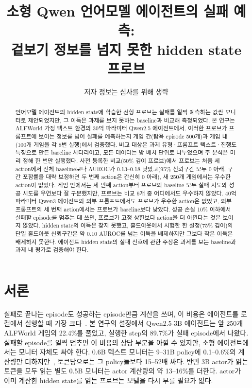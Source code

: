 \documentclass[10pt]{article}
\title{소형 Qwen 언어모델 에이전트의 실패 예측:\\겉보기 정보를 넘지 못한 hidden state 프로브}
\author{저자 정보는 심사를 위해 생략}
\date{}
\begin{document}
\maketitle

\begin{abstract}
언어모델 에이전트의 hidden state에 학습한 선형 프로브는 실패를 일찍 예측하는 값싼 모니터로 제안되었지만, 그 이득은 과제를 보지 못하는 baseline과 비교해 측정되었다.
본 연구는 ALFWorld 가정 텍스트 환경의 30억 파라미터 Qwen2.5 에이전트에서, 이러한 프로브가 프롬프트에 보이는 정보를 넘어 실패를 예측하는지 게임 간(탐욕 episode 500개)과 게임 내(100개 게임을 각 8번 실행)에서 검증했다.
비교 대상은 과제 유형·프롬프트 텍스트·진행도 특징으로 만든 baseline 사다리이고, 모든 데이터는 방 배치 단위로 나누었으며 주 분석은 미리 정해 한 번만 실행했다.
사전 등록한 비교(50\% 깊이 프로브)에서 프로브는 처음 세 action에서 전체 baseline보다 AUROC가 0.13--0.18 낮았고(95\% 신뢰구간 모두 0 아래, 구간 포함률을 대략 보정하면 두 번째 action은 간신히 0 아래), 새 250개 게임에서는 우수한 action이 없었다.
게임 안에서는 세 번째 action부터 프로브와 baseline 모두 실패 시도와 성공 시도를 우연보다 잘 구분했지만, 프로브는 비교 6개 중 어디에서도 우수하지 않았다.
40억 파라미터 Qwen3 에이전트와 외부 프롬프트에서도 프로브가 우수한 action은 없었고, 외부 프롬프트의 세 번째 action에서는 프로브가 baseline보다 낮았다.
성공 손실 10\% 이하에서 실패할 episode를 멈추는 데 쓰면, 프로브가 고정 상한보다 action을 더 아낀다는 것은 보이지 않았다.
hidden state의 이득은 찾지 못했고, 홀드아웃에서 시험한 한 설정(75\% 깊이)의 단일 홀드아웃 신뢰구간은 약 0.10 AUROC를 넘는 이득을 배제하지만 그보다 작은 이득은 배제하지 못한다.
에이전트 hidden state의 실패 신호에 관한 주장은 과제를 보는 baseline과 과제 내 평가로 검증해야 한다.
\end{abstract}

\section{서론}
실패로 끝나는 episode도 성공하는 episode만큼 계산을 쓰며, 이 비용은 에이전트를 로컬에서 실행할 때 가장 크다~\cite{pham2026agentstop}.
본 연구의 설정에서 Qwen2.5-3B 에이전트는 앞 250개 ALFWorld 게임의 22.4\%를 풀었고, 실행한 step의 89.7\%가 실패 episode에서 나왔다.
실패할 episode를 일찍 멈추면 이 비용의 상당 부분을 아낄 수 있지만, 소형 에이전트에서는 모니터 자체도 싸야 한다. 0.6B 텍스트 모니터는 9--31B policy에 0.1--0.6\%의 계산량만 더하지만~\cite{wang2026failfast},
토큰당으로는 그 policy들보다 15--52배 싸다. 반면 3B actor가 읽는 토큰을 모두 읽는 별도 0.5B 모니터는 actor 계산량의 약 13--16\%를 더한다. actor가 이미 계산한 hidden state를 읽는 프로브는 모델을 다시 부를 필요가 없다.
\end{document}
